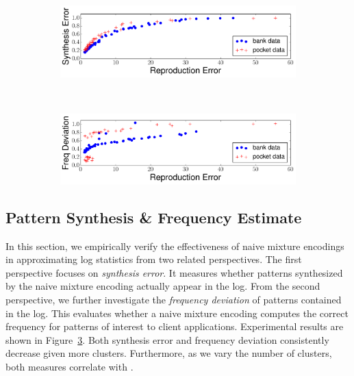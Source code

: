 \begin{figure}[h!]
\captionsetup[subfigure]{justification=centering}
    \centering 
    
\begin{subfigure}[b]{0.49\textwidth}
    \centering     
     \includegraphics[width=1\textwidth]{QueryLogSummarization/graphics/synthesis_error.pdf}
 \label{fig:synthesis_error_versus_reproduction_error}
\end{subfigure}
~
\begin{subfigure}[b]{0.49\textwidth}
    \centering      
    \includegraphics[width=1\textwidth]{QueryLogSummarization/graphics/marginal_deviation.pdf}
 \label{fig:marginal_deviation_versus_reproduction_error}
\end{subfigure}

 \label{fig:effectiveness_of_naive_mixture_encoding} 
 \trimfigurewhitespace
\end{figure} 

\subsection{Pattern Synthesis \& Frequency Estimate}
In this section, we empirically verify the effectiveness of naive mixture encodings in approximating log statistics from two related perspectives. 
The first perspective focuses on \textit{synthesis error}. 
It measures whether patterns synthesized by the naive mixture encoding actually appear in the log.
From the second perspective, we further investigate the \textit{frequency deviation} of patterns contained in the log.
This evaluates whether a naive mixture encoding computes the correct frequency for patterns of interest to client applications.
Experimental results are shown in Figure~\ref{fig:effectiveness_of_naive_mixture_encoding}.
Both synthesis error and frequency deviation consistently decrease given more clusters.
Furthermore, as we vary the number of clusters, both measures correlate with \errorname.

